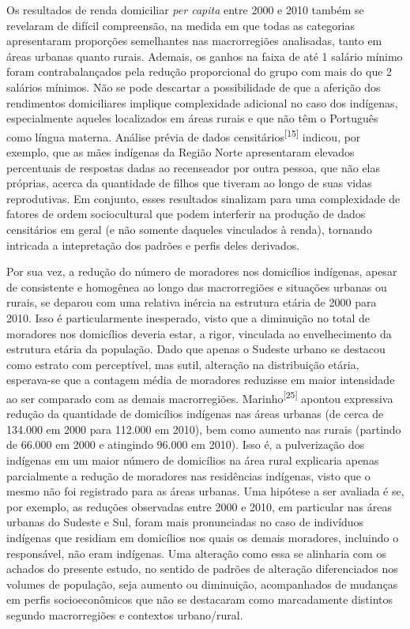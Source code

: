 \documentclass{article}
\begin{document}
Os resultados de renda domiciliar \textit{per capita}
entre 2000 e 2010 também se revelaram de difícil compreensão, na medida em que
todas as categorias apresentaram proporções semelhantes nas macrorregiões
analisadas, tanto em áreas urbanas quanto rurais. Ademais, os ganhos na faixa de
até 1 salário mínimo foram contrabalançados pela redução proporcional do grupo
com mais do que 2 salários mínimos. Não se pode descartar a possibilidade de que
a aferição dos rendimentos domiciliares implique complexidade adicional no caso
dos indígenas, especialmente aqueles localizados em áreas rurais e que não têm o
Português como língua materna. Análise prévia de dados censitários\textsuperscript{[}\textsuperscript{15}\textsuperscript{]}
indicou, por exemplo, que as mães indígenas da Região Norte apresentaram
elevados percentuais de respostas dadas ao recenseador por outra pessoa, que não
elas próprias, acerca da quantidade de filhos que tiveram ao longo de suas vidas
reprodutivas. Em conjunto, esses resultados sinalizam para uma complexidade de
fatores de ordem sociocultural que podem interferir na produção de dados
censitários em geral (e não somente daqueles vinculados à renda), tornando
intricada a intepretação dos padrões e perfis deles derivados.

Por sua vez, a redução do número de moradores nos domicílios indígenas, apesar
de consistente e homogênea ao longo das macrorregiões e situações urbanas ou
rurais, se deparou com uma relativa inércia na estrutura etária de 2000 para
2010. Isso é particularmente inesperado, visto que a diminuição no total de
moradores nos domicílios deveria estar, a rigor, vinculada ao envelhecimento da
estrutura etária da população. Dado que apenas o Sudeste urbano se destacou como
estrato com perceptível, mas sutil, alteração na distribuição etária,
esperava-se que a contagem média de moradores reduzisse em maior intensidade ao
ser comparado com as demais macrorregiões. Marinho\textsuperscript{[}\textsuperscript{25}\textsuperscript{]}
apontou expressiva redução da quantidade de domicílios indígenas nas áreas
urbanas (de cerca de 134.000 em 2000 para 112.000 em 2010), bem como aumento nas
rurais (partindo de 66.000 em 2000 e atingindo 96.000 em 2010). Isso é, a
pulverização dos indígenas em um maior número de domicílios na área rural
explicaria apenas parcialmente a redução de moradores nas residências indígenas,
visto que o mesmo não foi registrado para as áreas urbanas. Uma hipótese a ser
avaliada é se, por exemplo, as reduções observadas entre 2000 e 2010, em
particular nas áreas urbanas do Sudeste e Sul, foram mais pronunciadas no caso
de indivíduos indígenas que residiam em domicílios nos quais os demais
moradores, incluindo o responsável, não eram indígenas. Uma alteração como essa
se alinharia com os achados do presente estudo, no sentido de padrões de
alteração diferenciados nos volumes de população, seja aumento ou diminuição,
acompanhados de mudanças em perfis socioeconômicos que não se destacaram como
marcadamente distintos segundo macrorregiões e contextos urbano/rural.
\end{document}
